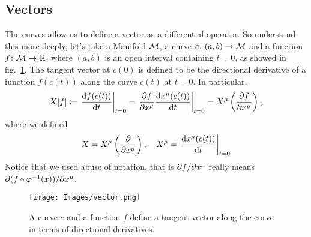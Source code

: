 \subsection{Vectors}
The curves allow us to define a vector as a differential operator. So understand this more deeply, let's take a Manifold $\mathcal{M}$, a curve $c\colon (a,b) \to \mathcal{M}$ and a function $f \colon \mathcal{M} \to \mathbb{R}$, where $(a,b)$ is an open interval containing $t=0$, as showed in fig.~\ref{fig:vector}. The tangent vector at $c(0)$ is defined to be the directional derivative of a function $f(c(t))$ along the curve $c(t)$ at $t=0$. In particular,
\begin{equation}
    X[f] \coloneq \left. \frac{\mathop{}\!\mathrm{d} f (c(t))}{\mathop{}\!\mathrm{d} t}\right|_{t=0} = \left. \frac{\partial f}{\partial x^\mu} \frac{\mathop{}\!\mathrm{d} x^\mu(c(t))}{\mathop{}\!\mathrm{d} t} \right|_{t=0} = X^\mu \left(\frac{\partial f}{\partial x^\mu}\right),
\end{equation}
where we defined
\begin{equation}\label{eq:def-vectors}
    X = X^\mu \left(\frac{\partial}{\partial x^\mu}\right), \quad X^\mu = \left. \frac{\mathop{}\!\mathrm{d} x^\mu(c(t))}{\mathop{}\!\mathrm{d} t} \right|_{t=0}
\end{equation}
Notice that we used abuse of notation, that is $\partial f / \partial x^\mu$ really means $\partial (f \circ \varphi^{-1}(x))/\partial x^\mu$.

\begin{figure}
    \centering
    \texttt{[image: Images/vector.png]}
    \caption{A curve $c$ and a function $f$ define a tangent vector along the curve in terms of directional derivatives.}
    \label{fig:vector}
\end{figure}

